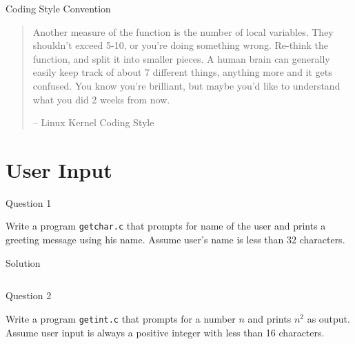 \documentclass[compress]{beamer}
\begin{document}
\begin{slide}
	\begin{block}{Coding Style Convention}

	\begin{quotation} \scriptsize \normalfont

	Another measure of the function is the number of local variables.
	They shouldn't exceed 5-10, or you're doing something wrong.
	Re-think the function, and split it into smaller pieces.
	A human brain can generally easily keep track of about 7 different things, anything more and it gets confused.
	You know you're brilliant, but maybe you'd like to understand what you did 2 weeks from now.

	\begin{flushright}-- Linux Kernel Coding Style\end{flushright}
	
	\end{quotation}

	\end{block}
\end{slide}

\section{User Input}

\begin{slide}
	\begin{block}{Question 1}

	Write a program \texttt{getchar.c} that prompts for name of the user and prints a greeting message using his name.
	Assume user's name is less than 32 characters.

	\end{block}
\end{slide}

\begin{slide}
	\begin{block}{Solution}

	\inputminted[fontsize=\scriptsize,firstline=10,lastline=27,linenos]{c}{
		\resDirectory/getchar.c
	}

	\end{block}
\end{slide}

\begin{slide}
	\begin{block}{Question 2}

	Write a program \texttt{getint.c} that prompts for a number $n$ and prints $n^2$ as output.
	Assume user input is always a positive integer with less than 16 characters.

	\end{block}
\end{slide}
\end{document}
